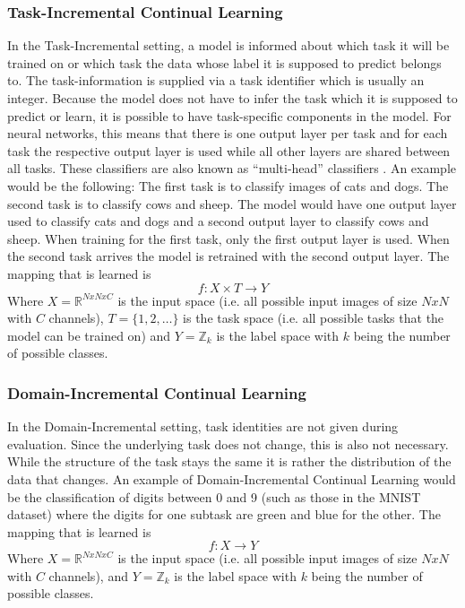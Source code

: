 \subsubsection{Task-Incremental Continual Learning}
\label{sec:TaskIncrementalContinualLearning}
In the Task-Incremental setting, a model is informed about which task it will be trained on or which task the data whose label it is supposed to predict belongs to.
The task-information is supplied via a task identifier which is usually an integer. Because the model does not have to infer the task which it is supposed to predict
or learn, it is possible to have task-specific components in the model. For neural networks, this means that there is one output layer per task and for each task the
respective output layer is used while all other layers are shared between all tasks. These classifiers are also known as \enquote{multi-head} classifiers \cite{van2018generative}.
An example would be the following: The first task is to classify images of cats and dogs. The second task is to classify cows and sheep. The model would have one output layer 
used to classify cats and dogs and a second output layer to classify cows and sheep. When training for the first task, only the first output layer is used. When the second task
arrives the model is retrained with the second output layer.  The mapping that is learned is 
\begin{equation}
    f: X \times T \rightarrow Y
\end{equation}
Where $X = \mathbb{R}^{N x N x C}$ is the input space (i.e. all possible input images of size $N x N$ with $C$ channels), $T = \{1,2,\ldots\}$ is the task space (i.e. all possible
tasks that the model can be trained on) and $Y = \mathbb{Z}_{k}$ is the label space with $k$ being the number of possible classes.
\subsubsection{Domain-Incremental Continual Learning}
\label{sec:DomainIncrementalContinualLearning}
In the Domain-Incremental setting, task identities are not given during evaluation. Since the underlying task does not change, this is also not necessary. While the structure of the task
stays the same it is rather the distribution of the data that changes. An example of Domain-Incremental Continual Learning would be the classification of digits between 0 and 9 (such as
those in the MNIST dataset) where the digits for one subtask are green and blue for the other. The mapping that is learned is 
\begin{equation}
    f: X \rightarrow Y
\end{equation}
Where $X = \mathbb{R}^{N x N x C}$ is the input space (i.e. all possible input images of size $N x N$ with $C$ channels), and $Y = \mathbb{Z}_{k}$ is the label space with $k$ being the
number of possible classes.

